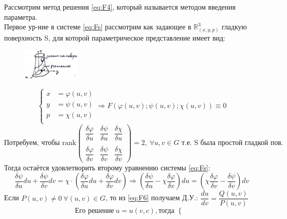 \begin{proposition}
	Рассмотрим метод решения \eqref{eq:F4}, который называется методом введения параметра. \\
	Первое ур-ние в системе \eqref{eq:Fs} рассмотрим как задающее в $\mathbb{ R }^3_{(x, y, p)} $ гладкую поверхность S, для которой параметрическое представление имеет вид:
	\begin{figure}[!h]
		\centering
		\includegraphics[width = 0.25\textwidth]{image_1.jpeg}
	\end{figure}	
	\[
	\left\{
	\begin{aligned}
		x &= \varphi(u, v)  \\
		y &= \psi(u, v) \\   
		p &= \chi(u, v) \\
	\end{aligned}
	\right.   
	\Rightarrow  F(\varphi(u, v); \psi(u, v); \chi(u, v)) \equiv 0                                                   
	\]
	\[
		\text{Потребуем, чтобы rank}
		\begin{pmatrix}                               
			\dfrac{\delta\varphi}{\delta u} & \dfrac{\delta \psi}{\delta u} & \dfrac{\delta \chi}{\delta u} \\
			\\
			\dfrac{\delta\varphi}{\delta v} & \dfrac{\delta \psi}{\delta v} & \dfrac{\delta \chi}{\delta v}
		\end{pmatrix} = 2, \ \forall u, v \in G \text{ т.е. S была простой гладкой пов.}
	\]
	Тогда остаётся удовлетворить второму уравнению системы \eqref{eq:Fs}: \\
	\begin{equation} \label{eq:F6}
		\frac{\delta \psi}{\delta u} du + \frac{\delta \psi}{\delta v} dv = \chi \cdot \left(\frac{\delta \varphi}{\delta u}du + \frac{\delta \varphi}{\delta v}dv\right) \Rightarrow \left( \frac{\delta \psi}{\delta u} - \chi \frac{\delta \varphi}{\delta v} \right) du = \left(\chi \frac{\delta \varphi}{\delta v} - \frac{\delta \psi}{\delta v} \right) dv
	\end{equation}
	Если $ P(u, v) \neq 0 \ \forall (u,v) \in G$, то из \eqref{eq:F6} получаем Д.У.: $ \dfrac{du}{dv} = \dfrac{Q(u, v)}{P(u, v)} $
	\[
		\text{Его решение} \  u = u(v, c),  \text{тогда } \left\{
		\begin{aligned}

\end{aligned}\]
\end{proposition}
